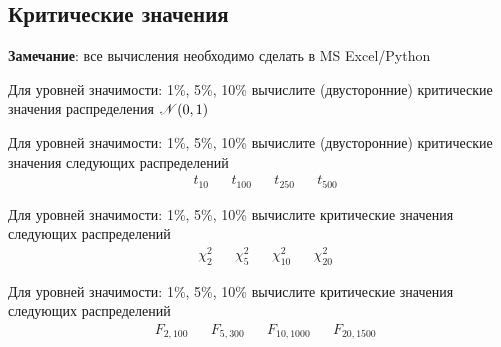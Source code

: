 \subsection{Критические значения}

\textbf{Замечание}: все вычисления необходимо сделать в MS Excel/Python

\begin{exercise}
Для уровней значимости: 1\%, 5\%, 10\% вычислите (двусторонние) 
критические значения распределения \({\mathscr N}(0,1)\)
\end{exercise}

\begin{exercise}
Для уровней значимости: 1\%, 5\%, 10\% вычислите (двусторонние) 
критические значения следующих распределений
\begin{align*}
	&t_{10} & &t_{100} & &t_{250} & &t_{500}
\end{align*}
\end{exercise}

\begin{exercise}
Для уровней значимости: 1\%, 5\%, 10\% вычислите
критические значения следующих распределений
\begin{align*}
	&\chi^2_{2} & &\chi^2_{5} & &\chi^2_{10} & &\chi^2_{20}
\end{align*}
\end{exercise}

\begin{exercise}
Для уровней значимости: 1\%, 5\%, 10\% вычислите
критические значения следующих распределений
\begin{align*}
	&F_{2,100} & &F_{5, 300} & &F_{10, 1000} & &F_{20, 1500}
\end{align*}
\end{exercise}